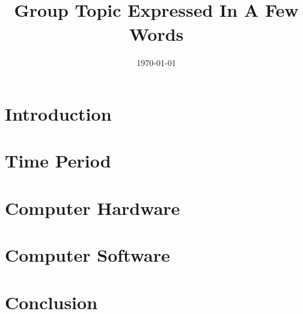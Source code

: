 \documentclass[11pt, twocolumn]{article}
\title{\LARGE \bf \thetitle \\
\large Group Topic Expressed In A Few Words}
\author{\theauthor}
\date{\today}
\providecommand{\main}{.}  %
\def\biblio{}
\begin{document}
\def\biblio{}
\maketitle

\section{Introduction}


\section{Time Period}


\section{Computer Hardware}


\section{Computer Software}


\section{Conclusion}




\end{document}
